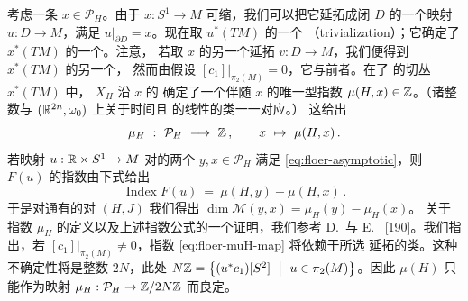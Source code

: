 考虑一条\trNondegenerate\trPeriodicOrbit{} $x\in\mathcal{P}_{H}$。由于%
$x:S^{1}\to M$ 可缩，我们可以把它延拓成闭\trDisc{} $D$ 的一个映射%
$u:D\to M$，满足 $u\big|_{\partial D}=x$。现在取 $u^{*}(TM)$ 的一个%
\textbf{\trTrivialization}（trivialization）；它确定了 $x^{*}(TM)$ 的一个\trTrivialization。注意，%
若取 $x$ 的另一个延拓 $v:D\to M$，我们便得到 $x^{*}(TM)$ 的另一个\trTrivialization，%
然而由假设 $[c_{1}]\big|_{\pi_{2}(M)}=0$，它与前者\trHomotopic。在\trTrivialization{}了%
的切丛 $x^{*}(TM)$ 中，\trHamiltonianVectorField{} $X_{H}$ 沿 $x$ 的%
\trLinearization\trFlow{}确定了一个伴随 $x$ 的唯一\trMaslov{}型指数%
$\mu(H,x)\in\mathbb{Z}$。（诸整数与 $(\mathbb{R}^{2n},\omega_{0})$ 上关于时间\trPeriodic{}且%
\trNondegenerate{}的线性\trHamiltonianSystem{}的\trHomotopy{}类一一对应。）%
这给出
\begin{equation}\label{eq:floer-muH-map}
\mu_{H}\ :\ \mathcal{P}_{H}\ \longrightarrow\ \Z\,,\qquad x\ \mapsto\ \mu(H,x)\,.
\end{equation}
若\trSmooth{}映射 $u:\mathbb{R}\times S^{1}\to M$ 对\trHamiltonianVectorField{}的两个%
\trNondegenerate\trPeriodicSolution{} $y,x\in\mathcal{P}_{H}$ 满足%
\eqref{eq:floer-asymptotic}，则 $F(u)$ 的\trFredholm{}指数由下式给出
\begin{equation}\label{eq:floer-index-formula}
\operatorname{Index}F(u)\ =\ \mu(H,y)-\mu(H,x)\,.
\end{equation}
于是对通有的对 $(H,J)$ 我们得出 $\dim\mathcal{M}(y,x)=\mu_{H}(y)-\mu_{H}(x)$。%
关于指数 $\mu_{H}$ 的定义以及上述指数公式的一个证明，我们参考%
D.~\trSalamon{}与 E.~\trZehnder{} [190]。我们指出，若%
$[c_{1}]\big|_{\pi_{2}(M)}\neq0$，指数 \eqref{eq:floer-muH-map} 将依赖于所选%
延拓的\trHomotopy{}类。这种不确定性将是整数 $2N$，此处%
$N\Z=\bigl\{(u^{*}c_{1})[S^{2}]\ \bigm|\ u\in\pi_{2}(M)\bigr\}$。因此%
$\mu(H)$ 只能作为映射 $\mu_{H}:\mathcal{P}_{H}\to\mathbb{Z}/2N\mathbb{Z}$ 而良定。


